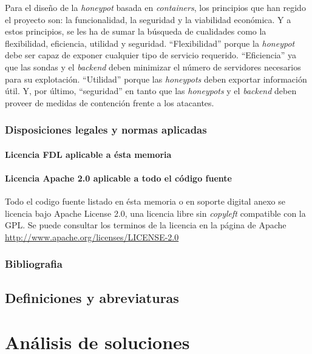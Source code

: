 Para el diseño de la \emph{honeypot} basada en \emph{containers}, los principios que han regido el proyecto son: la funcionalidad, la seguridad y la viabilidad económica. Y a estos principios, se les ha de sumar la búsqueda de cualidades como la flexibilidad, eficiencia, utilidad y seguridad. ``Flexibilidad'' porque la \emph{honeypot} debe ser capaz de exponer cualquier tipo de servicio requerido. ``Eficiencia'' ya que las sondas y el \emph{backend} deben minimizar el número de servidores necesarios para su explotación. ``Utilidad'' porque las \emph{honeypots} deben exportar información útil. Y, por último, ``seguridad''  en tanto que las \emph{honeypots} y el \emph{backend} deben proveer de medidas de contención frente a los atacantes.


\nocite{*}
\nopagebreak
\printbibheading[title={Normas y referencias},heading=subbibnumbered]
\subsection{Disposiciones legales y normas aplicadas}
\subsubsection{Licencia FDL aplicable a ésta memoria}

\subsubsection{Licencia Apache 2.0 aplicable a todo el código fuente}
Todo el codigo fuente listado en ésta memoria o en soporte digital anexo se licencia bajo Apache License 2.0, una licencia libre sin \emph{copyleft} compatible con la GPL.
Se puede consultar los terminos de la licencia en la página de Apache \url{http://www.apache.org/licenses/LICENSE-2.0}

\subsection{Bibliografia}
\printbibliography[title={Referencias},heading=none]
\nopagebreak
\section{Definiciones y abreviaturas}

\chapter{Análisis de soluciones}
\label{chapter:analisis-de-soluciones}
\minitoc{}



